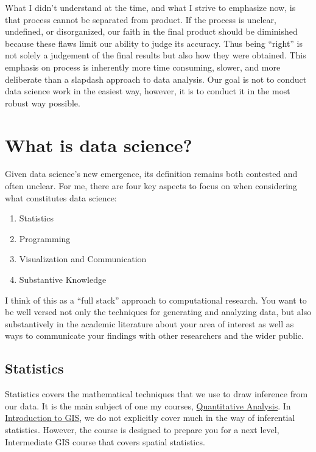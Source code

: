 \documentclass[]{book}
\providecommand{\tightlist}{%
  \setlength{\itemsep}{0pt}\setlength{\parskip}{0pt}}
\theoremstyle{definition}
\theoremstyle{definition}
\theoremstyle{definition}
\theoremstyle{remark}
\begin{document}
What I didn't understand at the time, and what I strive to emphasize
now, is that process cannot be separated from product. If the process is
unclear, undefined, or disorganized, our faith in the final product
should be diminished because these flaws limit our ability to judge its
accuracy. Thus being ``right'' is not solely a judgement of the final
results but also how they were obtained. This emphasis on process is
inherently more time consuming, slower, and more deliberate than a
slapdash approach to data analysis. Our goal is not to conduct data
science work in the easiest way, however, it is to conduct it in the
most robust way possible.

\section{What is data science?}\label{what-is-data-science}

Given data science's new emergence, its definition remains both
contested and often unclear. For me, there are four key aspects to focus
on when considering what constitutes data science:

\begin{enumerate}
\def\labelenumi{\arabic{enumi}.}
\tightlist
\item
  Statistics
\item
  Programming
\item
  Visualization and Communication
\item
  Substantive Knowledge
\end{enumerate}

I think of this as a ``full stack'' approach to computational research.
You want to be well versed not only the techniques for generating and
analyzing data, but also substantively in the academic literature about
your area of interest as well as ways to communicate your findings with
other researchers and the wider public.

\subsection{Statistics}\label{statistics}

Statistics covers the mathematical techniques that we use to draw
inference from our data. It is the main subject of one my courses,
\href{https://slu-soc5050.github.io}{Quantitative Analysis}. In
\href{https://slu-soc5650.github.io}{Introduction to GIS}, we do not
explicitly cover much in the way of inferential statistics. However, the
course is designed to prepare you for a next level, Intermediate GIS
course that covers spatial statistics.
\end{document}
